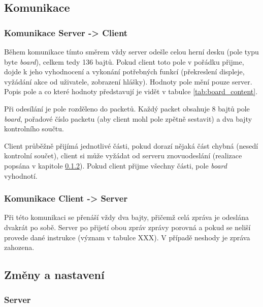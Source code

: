 \documentclass[a4paper,12pt, twoside]{article} %
\begin{document}
\subsection{Komunikace}
\subsubsection{Komunikace Server -> Client}
\label{sec:komunikace_server_client}
Během komunikace tímto směrem vždy server odešle celou herní desku (pole typu byte \textit{board}), celkem tedy 136 bajtů. Pokud client toto pole v pořádku přijme, dojde k jeho vyhodnocení a vykonání potřebných funkcí (překreslení displeje, vyžádání akce od uživatele, zobrazení hlášky). Hodnoty pole mění pouze server. Popis pole a co které hodnoty představují je vidět v tabulce \ref{tab:board_content}. 

Při odesílání je pole rozděleno do packetů. Každý packet obsahuje 8 bajtů pole \textit{board}, pořadové číslo packetu (aby client mohl pole zpětně sestavit) a dva bajty kontrolního součtu. 

Client průběžně přijímá jednotlivé části, pokud dorazí nějaká část chybná (nesedí kontrolní součet), client si může vyžádat od serveru znovuodeslání (realizace popsána v kapitole \ref{sec:komunikace_client_server}). Pokud client přijme všechny části, pole \textit{board} vyhodnotí.

%
\subsubsection{Komunikace Client -> Server}
\label{sec:komunikace_client_server}
Při této komunikaci se přenáší vždy dva bajty, přičemž celá zpráva je odeslána dvakrát po sobě. Server po přijetí obou zpráv zprávy porovná a pokud se neliší provede dané instrukce (význam v tabulce XXX). V případě neshody je zpráva zahozena. 

\subsection{Změny a nastavení}
\subsubsection{Server}
\label{sec:nastaveni_server}

\clearpage
\end{document}

